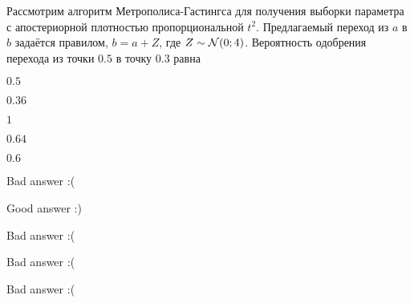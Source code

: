 
\begin{question}
Рассмотрим алгоритм Метрополиса-Гастингса для получения выборки
параметра с апостериорной плотностью пропорциональной \(t^2\).
Предлагаемый переход из \(a\) в \(b\) задаётся правилом, \(b = a + Z\),
где \(Z \sim \mathcal{N}(0;4)\). Вероятность одобрения перехода из точки \(0.5\)
в точку \(0.3\) равна
\begin{answerlist}
  \item \(0.5\)
  \item \(0.36\)
  \item \(1\)
  \item \(0.64\)
  \item \(0.6\)
\end{answerlist}
\end{question}

\begin{solution}
\begin{answerlist}
  \item Bad answer :(
  \item Good answer :)
  \item Bad answer :(
  \item Bad answer :(
  \item Bad answer :(
\end{answerlist}
\end{solution}

